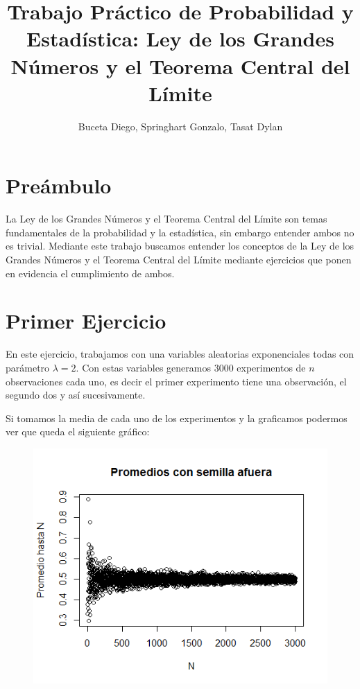 \documentclass[a4paper]{article}
\title{{\Huge Trabajo Pr\'actico de Probabilidad y Estad\'istica:
	\linebreak 
	Ley de los Grandes N\'umeros y el Teorema Central del L\'imite}}
\author{Buceta Diego, Springhart Gonzalo, Tasat Dylan}
\begin{document}
	\maketitle %
	\thispagestyle{empty} %
	
	\newpage %
	\setcounter{page}{1} %
	
	
	\section{Pre\'ambulo}
	La Ley de los Grandes N\'umeros y el Teorema Central del L\'imite son temas fundamentales de la probabilidad y la estad\'istica, sin embargo entender ambos no es trivial. Mediante este trabajo buscamos entender los conceptos de la Ley de los Grandes N\'umeros y el Teorema Central del L\'imite mediante ejercicios que ponen en evidencia el cumplimiento de ambos.
	
	\newpage
	
	\section{Primer Ejercicio}
	
	En este ejercicio, trabajamos con una variables aleatorias exponenciales todas con par\'ametro $\lambda = 2$. Con estas variables generamos 3000 experimentos de $n$ observaciones cada uno, es decir el primer experimento tiene una observaci\'on, el segundo dos y as\'i sucesivamente. 
	
Si tomamos la media de cada uno de los experimentos y la graficamos podermos ver que queda el siguiente gr\'afico:

	
	\begin{figure}[H]
		\includegraphics[scale=0.75]{grafico1}
		\centering
	\end{figure}
\end{document}

